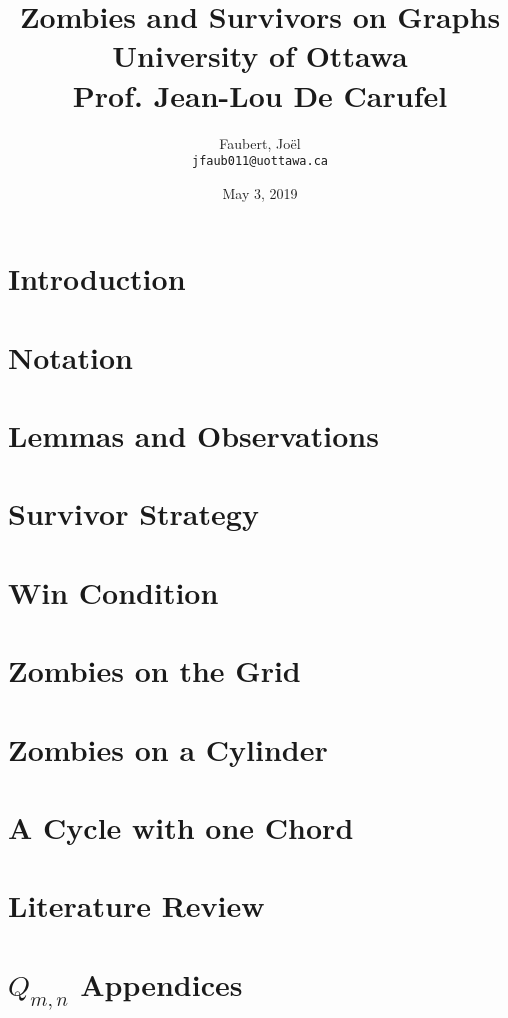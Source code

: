 \documentclass[letterpaper, 12pt]{report}
\author{
  Faubert, Jo\"el\\	\texttt{jfaub011@uottawa.ca}
}
\title{
	{Zombies and Survivors on Graphs}\\
	{\large University of Ottawa} \\
  {\large Prof. Jean-Lou De Carufel}
}
\date{May 3, 2019}
\theoremstyle{definition}
\begin{document}
\nocite{*}

\hypersetup{pageanchor=false}
\begin{titlepage}
\maketitle
\end{titlepage}
\hypersetup{pageanchor=true}


%

\tableofcontents

\cleardoublepage{}

\section{Introduction}


\section{Notation}


\section{Lemmas and Observations}


\section{Survivor Strategy}


\section{Win Condition}


\section{Zombies on the Grid}


\section{Zombies on a Cylinder}


\section{A Cycle with one Chord}


\section{Literature Review}


\newpage



\newpage
\appendix
\section{$Q_{m, n}$ Appendices}

\end{document}
